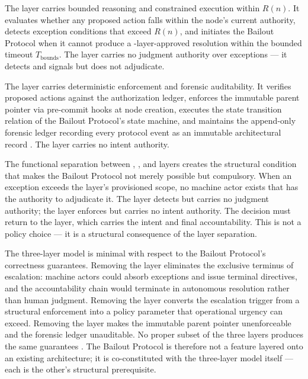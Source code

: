The \bounds{} layer carries bounded reasoning and constrained execution within $R(n)$. It evaluates whether any proposed action falls within the node's current authority, detects exception conditions that exceed $R(n)$, and initiates the Bailout Protocol when it cannot produce a \fact-layer-approved resolution within the bounded timeout $T_{\text{bounds}}$. The \bounds{} layer carries no judgment authority over exceptions --- it detects and signals but does not adjudicate.

The \fact{} layer carries deterministic enforcement and forensic auditability. It verifies proposed actions against the authorization ledger, enforces the immutable parent pointer via pre-commit hooks at node creation, executes the state transition relation of the Bailout Protocol's state machine, and maintains the append-only forensic ledger recording every protocol event as an immutable architectural record \cite{bx3framework}. The \fact{} layer carries no intent authority.

The functional separation between \purpose{}, \bounds{}, and \fact{} layers creates the structural condition that makes the Bailout Protocol not merely possible but compulsory. When an exception exceeds the \bounds{} layer's provisioned scope, no machine actor exists that has the authority to adjudicate it. The \bounds{} layer detects but carries no judgment authority; the \fact{} layer enforces but carries no intent authority. The decision must return to the \purpose{} layer, which carries the intent and final accountability. This is not a policy choice --- it is a structural consequence of the layer separation.

The three-layer model is minimal with respect to the Bailout Protocol's correctness guarantees. Removing the \purpose{} layer eliminates the exclusive terminus of escalation: machine actors could absorb exceptions and issue terminal directives, and the accountability chain would terminate in autonomous resolution rather than human judgment. Removing the \bounds{} layer converts the escalation trigger from a structural enforcement into a policy parameter that operational urgency can exceed. Removing the \fact{} layer makes the immutable parent pointer unenforceable and the forensic ledger unauditable. No proper subset of the three layers produces the same guarantees \cite{bx3framework}. The Bailout Protocol is therefore not a feature layered onto an existing architecture; it is co-constituted with the three-layer model itself --- each is the other's structural prerequisite.

